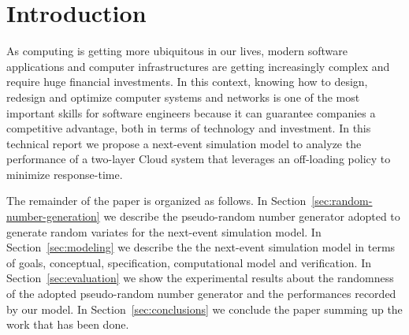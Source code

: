 \section{Introduction}
\label{sec:introduction}


As computing is getting more ubiquitous in our lives, modern software applications and computer infrastructures are getting increasingly complex and require huge financial investments.
%
In this context, knowing how to design, redesign and optimize computer systems and networks is one of the most important skills for software engineers because it can guarantee companies a competitive advantage, both in terms of technology and investment.
%
In this technical report we propose a next-event simulation model to analyze the performance of a two-layer Cloud system that leverages an off-loading policy to minimize response-time.


The remainder of the paper is organized as follows.
%
In Section~\ref{sec:random-number-generation} we describe the pseudo-random number generator adopted to generate random variates for the next-event simulation model.
%
In Section~\ref{sec:modeling} we describe the the next-event simulation model in terms of goals, conceptual, specification, computational model and verification.
%
In Section~\ref{sec:evaluation} we show the experimental results about the randomness of the adopted pseudo-random number generator and the performances recorded by our model.
%
In Section~\ref{sec:conclusions} we conclude the paper summing up the work that has been done.
